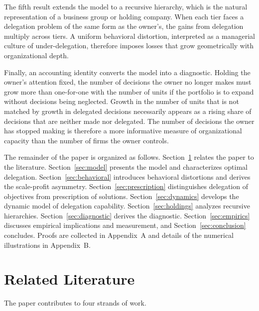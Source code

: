 \documentclass[11pt,a4paper]{article}
\theoremstyle{plain}
\begin{document}
The fifth result extends the model to a recursive hierarchy, which is the natural representation of a business group or holding company. When each tier faces a delegation problem of the same form as the owner's, the gains from delegation multiply across tiers. A uniform behavioral distortion, interpreted as a managerial culture of under-delegation, therefore imposes losses that grow geometrically with organizational depth.

Finally, an accounting identity converts the model into a diagnostic. Holding the owner's attention fixed, the number of decisions the owner no longer makes must grow more than one-for-one with the number of units if the portfolio is to expand without decisions being neglected. Growth in the number of units that is not matched by growth in delegated decisions necessarily appears as a rising share of decisions that are neither made nor delegated. The number of decisions the owner has stopped making is therefore a more informative measure of organizational capacity than the number of firms the owner controls.

The remainder of the paper is organized as follows. Section~\ref{sec:lit} relates the paper to the literature. Section~\ref{sec:model} presents the model and characterizes optimal delegation. Section~\ref{sec:behavioral} introduces behavioral distortions and derives the scale-profit asymmetry. Section~\ref{sec:prescription} distinguishes delegation of objectives from prescription of solutions. Section~\ref{sec:dynamics} develops the dynamic model of delegation capability. Section~\ref{sec:holdings} analyzes recursive hierarchies. Section~\ref{sec:diagnostic} derives the diagnostic. Section~\ref{sec:empirics} discusses empirical implications and measurement, and Section~\ref{sec:conclusion} concludes. Proofs are collected in Appendix~A and details of the numerical illustrations in Appendix~B.

\section{Related Literature}\label{sec:lit}

The paper contributes to four strands of work.
\end{document}
